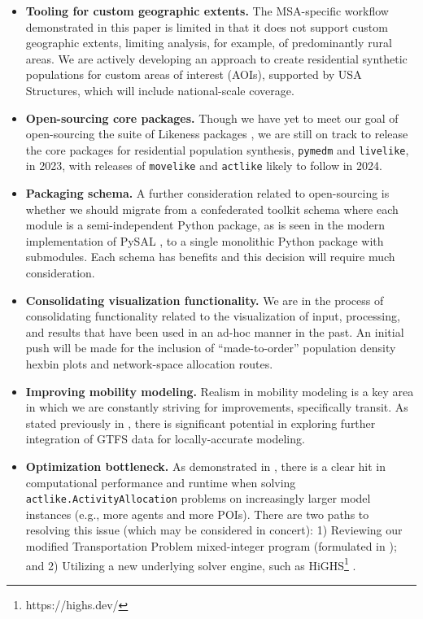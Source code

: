 \begin{itemize}
    \item \textbf{Tooling for custom geographic extents.} The MSA-specific workflow demonstrated in this paper is limited in that it does not support custom geographic extents, limiting analysis, for example, of predominantly rural areas. 
    We are actively developing an approach to create residential synthetic populations for custom areas of interest (AOIs), supported by USA Structures, which will include national-scale coverage. 
    \item \textbf{Open-sourcing core packages.} Though we have yet to meet our goal of open-sourcing the suite of Likeness packages \cite{likeness-scipy-paper-2022}, we are still on track to release the core packages for residential population synthesis, \texttt{pymedm} and \texttt{livelike}, in 2023, with releases of \texttt{movelike} and \texttt{actlike} likely to follow in 2024.
    \item \textbf{Packaging schema.} A further consideration related to open-sourcing is whether we should migrate from a confederated toolkit schema where each module is a semi-independent Python package, as is seen in the modern implementation of PySAL \cite{pysal_GA_2022}, to a single monolithic Python package with submodules. Each schema has benefits and this decision will require much consideration. 
    \item \textbf{Consolidating visualization functionality.} We are in the process of consolidating functionality related to the visualization of input, processing, and results that have been used in an ad-hoc manner in the past. An initial push will be made for the inclusion of ``made-to-order'' population density hexbin plots and network-space allocation routes.
    \item \textbf{Improving mobility modeling.} Realism in mobility modeling is a key area in which we are constantly striving for improvements, specifically transit. As stated previously in , there is significant potential in exploring further integration of GTFS data for locally-accurate modeling.
    \item \textbf{Optimization bottleneck.} As demonstrated in , there is a clear hit in computational performance and runtime when solving  \texttt{actlike.ActivityAllocation} problems on increasingly larger model instances (e.g., more agents and more POIs). There are two paths to resolving this issue (which may be considered in concert): 1) Reviewing our modified Transportation Problem mixed-integer program (formulated in \cite{likeness-scipy-paper-2022}); and 2) Utilizing a new underlying solver engine, such as HiGHS\footnote{https://highs.dev/} \cite{highs_mpc_2018}.
\end{itemize}

